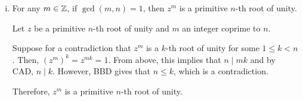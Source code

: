 \documentclass{agony}
\begin{document}
\begin{enumerate}[(a)]
\begin{enumerate}[i.]
\begin{proof}
                  If $r=0$, then $j = qn$ and $j \mid n$.
                  Otherwise, we have $1 \leq r \leq n-1$ and $z^r = 1$, which is a contradiction
                  to the fact that $z$ is a primitive $n$-th root of unity.

                  Therefore, $r = 0$ and $j \mid n$.

                  ($\Larr$) If $n \mid j$ and $j = nk$ for an integer $k$,
                  then $z^j = z^{nk} = (z^n)^k = 1^k = 1$.
                \end{proof}
          \item For any $m\in\mathbb{Z}$, if $\gcd(m,n)=1$, then $z^m$ is a primitive $n$-th root of unity.
                \begin{prf}
                  Let $z$ be a primitive $n$-th root of unity and $m$ an integer coprime to $n$.
                  
                  Suppose for a contradiction that $z^m$ is a $k$-th root of unity for some $1 \leq k < n$.
                  Then, $(z^m)^k = z^{mk} = 1$.
                  From above, this implies that $n \mid mk$ and by CAD, $n \mid k$.
                  However, BBD gives that $n \leq k$, which is a contradiction.

                  Therefore, $z^m$ is a primitive $n$-th root of unity.
                \end{prf}
        \end{enumerate}
\end{enumerate}
\end{document}
